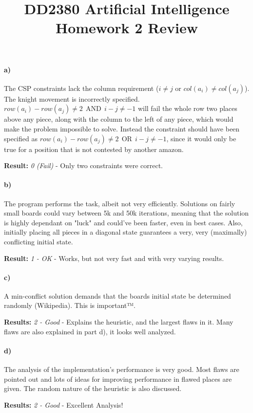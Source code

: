 \documentclass[a4paper,11pt]{article}
\title{DD2380 Artificial Intelligence\\
        Homework 2 Review}
\begin{document}
\maketitle

\paragraph{a)}
The CSP constraints lack the column requirement ($i \neq j$ or $col(a_i) \neq col(a_j)$). The knight movement is incorrectly specified. $row(a_i) - row(a_j) \neq 2 ~~\mbox{AND}~~ i-j \neq -1$ will fail the whole row two places above any piece, along with the column to the left of any piece, which would make the problem impossible to solve. Instead the constraint should have been specified as $row(a_i) - row(a_j) \neq 2 ~~\mbox{OR}~~ i-j \neq -1$, since it would only be true for a position that is not contested by another amazon.

\textbf{Result:} \emph{0 (Fail)} - Only two constraints were correct. 

\paragraph{b)}
The program performs the task, albeit not very efficiently. Solutions on fairly small boards could vary between 5k and 50k iterations, meaning that the solution is highly dependant on "luck" and could've been faster, even in best cases. Also, initially placing all pieces in a diagonal state guarantees a very, very (maximally) conflicting initial state.

\textbf{Result:} \emph{1 - OK} - Works, but not very fast and with very varying results.

\paragraph{c)}
A min-conflict solution demands that the boards initial state be determined randomly (Wikipedia). This is important™.

\textbf{Results:} \emph{2 - Good} - Explains the heuristic, and the largest flaws in it. Many flaws are also explained in part d), it looks well analyzed.

\paragraph{d)}
The analysis of the implementation's performance is very good. Most flaws are pointed out and lots of ideas for improving performance in flawed places are given. The random nature of the heuristic is also discussed.

\textbf{Results:} \emph{2 - Good} - Excellent Analysis!
\end{document}
